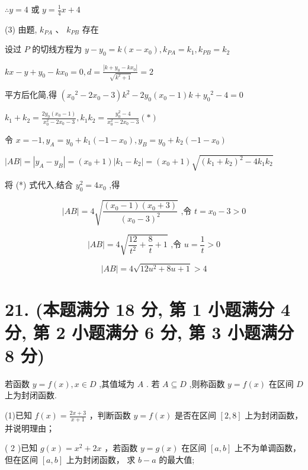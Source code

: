 \documentclass[10pt]{article}
\begin{document}
\(\therefore y = 4\) 或 \(y = \frac{1}{4}x + 4\)

(3) 由题, \({k}_{PA}\text{ 、 }{k}_{PB}\) 存在

设过 \(P\) 的切线方程为 \(y - {y}_{0} = k\left( {x - {x}_{0}}\right) ,{k}_{PA} = {k}_{1},{k}_{PB} = {k}_{2}\)

\({kx} - y + {y}_{0} - k{x}_{0} = 0,d = \frac{\left| k + {y}_{0} - k{x}_{0}\right| }{\sqrt{{k}^{2} + 1}} = 2\)

平方后化简,得 \(\left( {{x}_{0}{}^{2} - 2{x}_{0} - 3}\right) {k}^{2} - 2{y}_{0}\left( {{x}_{0} - 1}\right) k + {y}_{0}{}^{2} - 4 = 0\)

\({k}_{1} + {k}_{2} = \frac{2{y}_{0}\left( {{x}_{0} - 1}\right) }{{x}_{0}^{2} - 2{x}_{0} - 3},{k}_{1}{k}_{2} = \frac{{y}_{0}^{2} - 4}{{x}_{0}^{2} - 2{x}_{0} - 3}\left( *\right)\)

令 \(x =  - 1,{y}_{A} = {y}_{0} + {k}_{1}\left( {-1 - {x}_{0}}\right) ,{y}_{B} = {y}_{0} + {k}_{2}\left( {-1 - {x}_{0}}\right)\)

\(\left| {AB}\right|  = \left| {{y}_{A} - {y}_{B}}\right|  = \left( {{x}_{0} + 1}\right) \left| {{k}_{1} - {k}_{2}}\right|  = \left( {{x}_{0} + 1}\right) \sqrt{{\left( {k}_{1} + {k}_{2}\right) }^{2} - 4{k}_{1}{k}_{2}}\)

将 (*) 式代入,结合 \({y}_{0}^{2} = 4{x}_{0}\) ,得

\[
\left| {AB}\right|  = 4\sqrt{\frac{\left( {{x}_{0} - 1}\right) \left( {{x}_{0} + 3}\right) }{{\left( {x}_{0} - 3\right) }^{2}}}\text{ ,令 }t = {x}_{0} - 3 > 0
\]

\[
\left| {AB}\right|  = 4\sqrt{\frac{12}{{t}^{2}} + \frac{8}{t} + 1}\text{ ,令 }u = \frac{1}{t} > 0
\]

\[
\left| {AB}\right|  = 4\sqrt{{12}{u}^{2} + {8u} + 1} > 4
\]

\section*{21. (本题满分 18 分, 第 1 小题满分 4 分, 第 2 小题满分 6 分, 第 3 小题满分 8 分)}

若函数 \(y = f\left( x\right) ,x \in  D\) ,其值域为 \(A\) . 若 \(A \subseteq  D\) ,则称函数 \(y = f\left( x\right)\) 在区间 \(D\) 上为封闭函数.

(1)已知 \(f\left( x\right)  = \frac{{2x} + 3}{x + 1}\) ，判断函数 \(y = f\left( x\right)\) 是否在区间 \(\left\lbrack  {2,8}\right\rbrack\) 上为封闭函数，并说明理由；

( 2 )已知 \(g\left( x\right)  = {x}^{2} + {2x}\) ，若函数 \(y = g\left( x\right)\) 在区间 \(\left\lbrack  {a,b}\right\rbrack\) 上不为单调函数，但在区间 \(\left\lbrack  {a,b}\right\rbrack\) 上为封闭函数， 求 \(b - a\) 的最大值;
\end{document}
